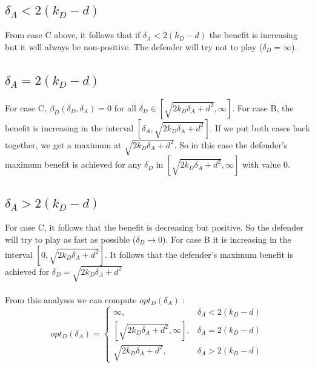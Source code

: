 \subsection*{$\delta_{A} < 2(k_{D} - d)$}
From case C above, it follows that if $\delta_{A} < 2(k_{D} - d)$ the benefit is increasing but it will always be non-positive. The defender will try not to play ($\delta_{D}= \infty$). 


\subsection*{$\delta_{A} = 2(k_{D} - d)$}
For case C, $\beta_{D}(\delta_{D}, \delta_{A})=0$ for  all $\delta_{D} \in [\sqrt{2k_{D}\delta_{A} + d^{2}}, \infty]$. For case B, the benefit is increasing in the interval $[\delta_{A},\sqrt{2k_{D}\delta_{A} + d^{2}}]$. If we put both cases back together, we get a maximum at $\sqrt{2k_{D}\delta_{A} + d^{2}}$. So in this case the defender's maximum benefit is achieved for any $\delta_{D}$ in $[\sqrt{2k_{D}\delta_{A} + d^{2}}, \infty]$ with value 0.

\subsection*{$\delta_{A} > 2(k_{D} - d)$ }
For case C, it follows that the benefit is decreasing but positive. So the defender will try to play as fast as possible ($\delta_{D} \rightarrow 0$). For case B it is increasing in the interval $[ 0,\sqrt{2k_{D}\delta_{A} + d^{2}}]$. It follows that the defender's maximum benefit is achieved for $\delta_{D} = \sqrt{2k_{D}\delta_{A} + d^{2}} $  \\


~~\\
From this analyses we can compute $opt_{D}(\delta_{A})$ : \\

 \begin{displaymath}
  opt_{D}(\delta_{A}) = \left\{
     \begin{array}{lr}
          \infty , & \delta_{A} < 2(k_{D} - d)\\
      \left[ \sqrt{2k_{D}\delta_{A} + d^{2}},\infty\right] , & \delta_{A} = 2(k_{D} - d) \\
      \sqrt{2k_{D}\delta_{A} + d^{2}}, & \delta_{A} > 2(k_{D} - d)
     \end{array}
   \right.
\end{displaymath}

